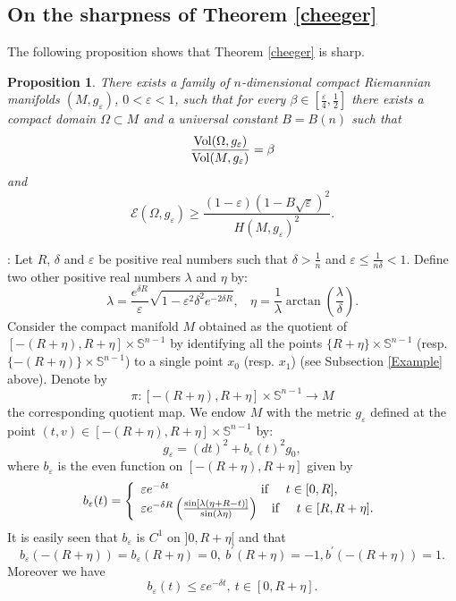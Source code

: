 \documentclass[11pt, reqno]{amsart}
\newtheorem{proposition}[theoreme]{Proposition}
\theoremstyle{plain}
\begin{document}
\subsection* {On the sharpness of Theorem \ref{cheeger}}
The following  proposition  shows that Theorem \ref{cheeger} is sharp.
\begin{proposition}\label{propsharp}
There exists  a family of  $n$-dimensional compact Riemannian manifolds $(M, g_{\varepsilon})$, $0<\varepsilon<1$,
such that for every $\beta \in [\frac{\varepsilon}{4}, \frac{1}{2}]$
there exists a compact domain $\Omega \subset M$ 
and a universal constant $B=B(n)$ such that
\begin{equation}\label{volbeta}
\frac{{\rm Vol}(\Omega , g_{\varepsilon})}{{\rm Vol}(M, g_{\varepsilon})}=\beta
\end{equation}
and
\begin{equation}\label{eomegahm}
{\mathcal E}(\Omega, g_{\varepsilon})\geq \frac{(1-\varepsilon)(1-B\sqrt{\varepsilon})^2}{H(M, g_{\varepsilon})^2} .
\end{equation}
\end{proposition}
: 
Let  $R$,  $\delta$ and $\varepsilon$ be  positive real numbers 
such that $\delta >\frac{1}{n}$ and $\varepsilon \leq \frac{1}{n\delta}<1$.
 Define two other  positive real numbers $\lambda$ and $\eta$ by: 
$$\lambda =\frac{e^{\delta R}}{\varepsilon}\sqrt{1-\varepsilon^2\delta^2e^{-2\delta R}},\ \ \ \  \eta =\frac{1}{\lambda}\arctan (\frac{\lambda}{\delta}).$$
Consider the compact  manifold $M$ obtained as the quotient of  $[-(R+\eta), R+\eta]\times \mathbb S^{n-1}$  by   identifying 
all  the points $\{R+\eta\}\times \mathbb S^{n-1}$ (resp. $\{-(R+\eta)\}\times \mathbb S^{n-1}$) to a single point $x_0$ (resp. $x_1$)
(see Subsection \ref{Example} above). 
Denote by  
$$\pi:  [-(R+\eta), R+\eta]\times \mathbb S^{n-1}\rightarrow M$$
the  corresponding quotient map.
We endow $M$ with the metric $g_\varepsilon$ defined at the point $(t, v)\in [-(R+\eta), R+\eta]\times \mathbb S^{n-1}$ by:
$$g_{\varepsilon}=(dt)^2+b_{\varepsilon}(t)^2g_0,$$
where  $b_{\varepsilon}$ is the even function  on $[-(R+\eta), R+\eta]$ given  by
$$b_{\varepsilon}(t)= \left\{\begin{array}{l}
\varepsilon  e^{-\delta t}\ \  \ \ \ \ \ \ \ \ \ \ \ \ \ \ \ \ \ \ \ \ {\rm if \ }\ \ \ t\in [0, R], \\
\varepsilon e^{-\delta R} \left(\frac{\sin[\lambda (\eta +R-t)]}{\sin (\lambda\eta)}\right) \ \ \ {\rm if \ }\ \ \ t\in [R, R+\eta].
\end{array}\right.$$
It is easily seen that $b_{\varepsilon}$ is $C^{1}$ on $]0, R+\eta [$ and  that 
$$b_{\varepsilon}(-(R+\eta))=b_{\varepsilon}(R+\eta)=0, \  b^{'}(R+\eta)=-1,  b^{'}(-(R+\eta))=1.$$
Moreover we have
\begin{equation}\label{bepsminore}
b_{\varepsilon}(t)\leq \varepsilon e^{-\delta t}, \ t\in [0, R+\eta].
\end{equation}
\end{document}
